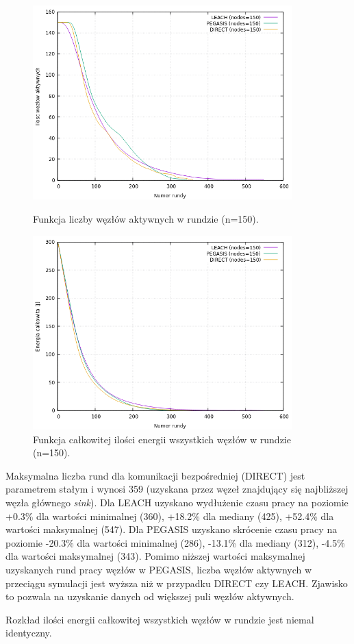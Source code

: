 \documentclass[a4paper,12pt,twoside,openany]{report}
\begin{document}
\begin{figure}[H]
 \centering
 \includegraphics[width=10cm]{images/gnuplot/test_2/nodes_in_round_150.png}
 \caption{Funkcja liczby węzłów aktywnych w rundzie (n=150).}
 \includegraphics[width=10cm]{images/gnuplot/test_2/energy_in_round_150.png}
 \caption{Funkcja całkowitej ilości energii wszystkich węzłów w rundzie (n=150).}
\end{figure}

\par
Maksymalna liczba rund dla komunikacji bezpośredniej (DIRECT) jest parametrem stałym i wynosi 359 (uzyskana przez węzeł znajdujący się najbliższej węzła głównego \textit{sink}).
Dla LEACH uzyskano wydłużenie czasu pracy na poziomie +0.3\% dla wartości minimalnej (360), +18.2\% dla mediany (425), +52.4\% dla wartości maksymalnej (547).
Dla PEGASIS uzyskano skrócenie czasu pracy na poziomie -20.3\% dla wartości minimalnej (286), -13.1\% dla mediany (312), -4.5\% dla wartości maksymalnej (343).
Pomimo niższej wartości maksymalnej uzyskanych rund pracy węzłów w PEGASIS, liczba węzłów aktywnych w przeciągu symulacji jest wyższa niż w przypadku DIRECT czy LEACH.
Zjawisko to pozwala na uzyskanie danych od większej puli węzłów aktywnych.
\par
Rozkład ilości energii całkowitej wszystkich węzłów w rundzie jest niemal identyczny.
\end{document}
